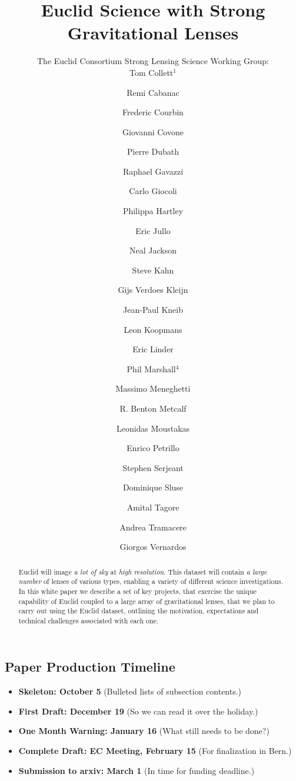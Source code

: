 \documentclass[twocolumn]{svjour3}
\begin{document}
\title{Euclid Science with Strong Gravitational Lenses}

\author{The Euclid Consortium Strong Lensing Science Working Group:\\
Tom Collett$^1$ \and
Remi Cabanac \and
Frederic Courbin \and
Giovanni Covone \and
Pierre Dubath \and
Raphael Gavazzi \and
Carlo Giocoli \and
Philippa Hartley \and
Eric Jullo \and
Neal Jackson \and
Steve Kahn \and
Gijs Verdoes Kleijn \and
Jean-Paul Kneib \and
Leon Koopmans \and
Eric Linder \and
Phil Marshall$^4$ \and
Massimo Meneghetti \and
R. Benton Metcalf \and
Leonidas Moustakas \and
Enrico Petrillo \and
Stephen Serjeant \and
Dominique Sluse \and
Amital Tagore \and
Andrea Tramacere \and
Giorgos Vernardos
}



\maketitle


\begin{abstract}
\noindent Euclid will image \emph{a lot of sky} at \emph{high
resolution}. This dataset will contain {\it a large number} of lenses of
various types, enabling a variety  of different  science investigations.
In this white paper we describe a set of key projects, that exercise the
unique capability of Euclid coupled to a large array of gravitational
lenses, that we plan to carry out using the Euclid dataset, outlining
the motivation, expectations and technical challenges associated with
each one.
\end{abstract}


\subsection*{Paper Production Timeline}
\begin{itemize}
    \item {\bf Skeleton: October 5} (Bulleted lists of subsection contents.)
    \item {\bf First Draft: December 19} (So we can read it over the holiday.)
    \item {\bf One Month Warning: January 16} (What still needs to be done?)
    \item {\bf Complete Draft: EC Meeting, February 15} (For finalization in Bern.)
    \item {\bf Submission to arxiv: March 1} (In time for funding deadline.)
\end{itemize}
\end{document}
